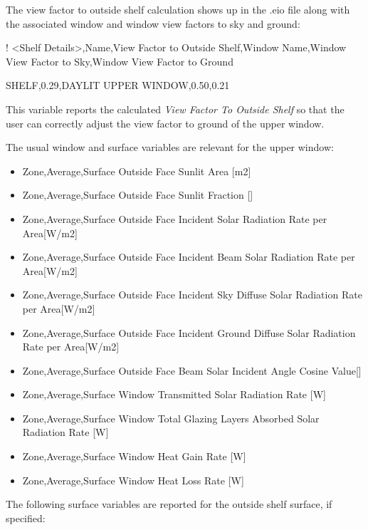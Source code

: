 The view factor to outside shelf calculation shows up in the .eio file along with the associated window and window view factors to sky and ground:

! \textless{}Shelf Details\textgreater{},Name,View Factor to Outside Shelf,Window Name,Window View Factor to Sky,Window View Factor to Ground

SHELF,0.29,DAYLIT UPPER WINDOW,0.50,0.21

This variable reports the calculated \emph{View Factor To Outside Shelf} so that the user can correctly adjust the view factor to ground of the upper window.

The usual window and surface variables are relevant for the upper window:

\begin{itemize}
\item
  Zone,Average,Surface Outside Face Sunlit Area {[}m2{]}
\item
  Zone,Average,Surface Outside Face Sunlit Fraction {[]}
\item
  Zone,Average,Surface Outside Face Incident Solar Radiation Rate per Area{[}W/m2{]}
\item
  Zone,Average,Surface Outside Face Incident Beam Solar Radiation Rate per Area{[}W/m2{]}
\item
  Zone,Average,Surface Outside Face Incident Sky Diffuse Solar Radiation Rate per Area{[}W/m2{]}
\item
  Zone,Average,Surface Outside Face Incident Ground Diffuse Solar Radiation Rate per Area{[}W/m2{]}
\item
  Zone,Average,Surface Outside Face Beam Solar Incident Angle Cosine Value{[]}
\item
  Zone,Average,Surface Window Transmitted Solar Radiation Rate {[}W{]}
\item
  Zone,Average,Surface Window Total Glazing Layers Absorbed Solar Radiation Rate {[}W{]}
\item
  Zone,Average,Surface Window Heat Gain Rate {[}W{]}
\item
  Zone,Average,Surface Window Heat Loss Rate {[}W{]}
\end{itemize}

The following surface variables are reported for the outside shelf surface, if specified:


